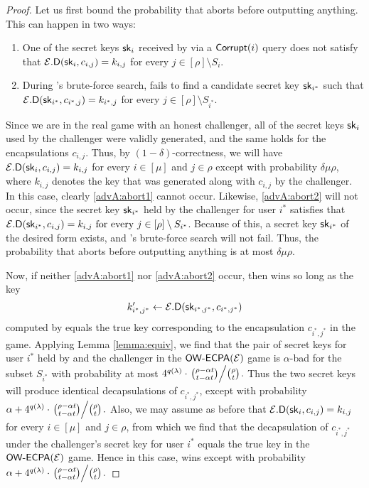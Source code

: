 \begin{proof}
  Let us first bound the probability that \advA aborts before outputting anything.
  This can happen in two ways:
  \begin{enumerate}
    \item\label{advA:abort1} One of the secret keys \(\mathsf{sk}_{i}\) received by \advA
          via a \(\mathsf{Corrupt}(i)\) query does not satisfy that \(\mathcal{E}.\mathsf{D}(\mathsf{sk}_{i}, c_{i,j}) = k_{i,j}\)
          for every \(j \in [\rho] \setminus S_{i}\).
    \item\label{advA:abort2} During \advA's brute-force search, \advA fails to find a candidate secret key \(\mathsf{sk}_{i^{*}}\)
          such that \(\mathcal{E}.\mathsf{D}(\mathsf{sk}_{i^{*}}, c_{i^{*},j}) = k_{i^{*},j}\) for every \(j \in [\rho] \setminus S_{i^{*}}\).
  \end{enumerate}
  Since we are in the real game with an honest challenger,
  all of the secret keys \(\mathsf{sk}_{i}\) used by the challenger
  were validly generated, and the same holds for the encapsulations \(c_{i,j}\).
  Thus, by \((1 - \delta)\)-correctness,
  we will have \(\mathcal{E}.\mathsf{D}(\mathsf{sk}_{i},c_{i,j}) = k_{i,j}\) for every \(i \in [\mu]\) and \(j \in \rho\)
  except with probability \(\delta \mu \rho\),
  where \(k_{i,j}\) denotes the key that was generated along with \(c_{i,j}\) by the challenger.
  In this case, clearly \ref{advA:abort1} cannot occur.
  Likewise, \ref{advA:abort2} will not occur,
  since the secret key \(\mathsf{sk}_{i^{*}}\) held by the challenger for user \(i^{*}\)
  satisfies that \(\mathcal{E}.\mathsf{D}(\mathsf{sk}_{i^{*}}, c_{i,j}) = k_{i,j} \text{ for every } j \in [\rho] \setminus S_{i^{*}}\).
  Because of this, a secret key \(\mathsf{sk}_{i^{*}}\) of the desired form exists,
  and \advA's brute-force search will not fail.
  Thus, the probability that \advA aborts before outputting anything is at most \(\delta \mu \rho\).

  Now, if neither \ref{advA:abort1} nor \ref{advA:abort2} occur,
  then \advA wins so long as the key
  \[
  k_{i^{*},j^{*}}' \leftarrow \mathcal{E}.\mathsf{D}(\mathsf{sk}_{i^{*},j^{*}}, c_{i^{*},j^{*}})
  \]
  computed by \advA equals the true key corresponding to the encapsulation \(c_{i^{*},j^{*}}\) in the game.
  Applying Lemma \ref{lemma:equiv},
  we find that the pair of secret keys for user \(i^{*}\) held by \advA
  and the challenger in the \(\mathsf{OW}\text{-}\mathsf{ECPA}(\mathcal{E})\) game is
  \(\alpha\)-bad for the subset \(S_{i^{*}}\) with probability at most
  \(
    4^{q(\lambda)} \cdot \left. \binom{\rho - \alpha t}{t - \alpha t} \middle/ \binom{\rho}{t} \right..
  \)
  Thus the two secret keys will produce identical decapsulations of \(c_{i^{*},j^{*}}\), except with probability
  \(
    \alpha +
  4^{q(\lambda)} \cdot \left. \binom{\rho - \alpha t}{t - \alpha t} \middle/ \binom{\rho}{t} \right..
  \)
  Also, we may assume as before that
  \(\mathcal{E}.\mathsf{D}(\mathsf{sk}_{i},c_{i,j}) = k_{i,j}\) for every \(i \in [\mu]\) and \(j \in \rho\),
  from which we find that the decapsulation of \(c_{i^{*},j^{*}}\)
  under the challenger's secret key for user \(i^{*}\)
  equals the true key in the \(\mathsf{OW}\text{-}\mathsf{ECPA}(\mathcal{E})\) game.
  Hence in this case, \advA wins except with probability
  \(
  \alpha
  + 4^{q(\lambda)} \cdot \left. \binom{\rho - \alpha t}{t - \alpha t} \middle/ \binom{\rho}{t} \right..
  \)


\end{proof}
